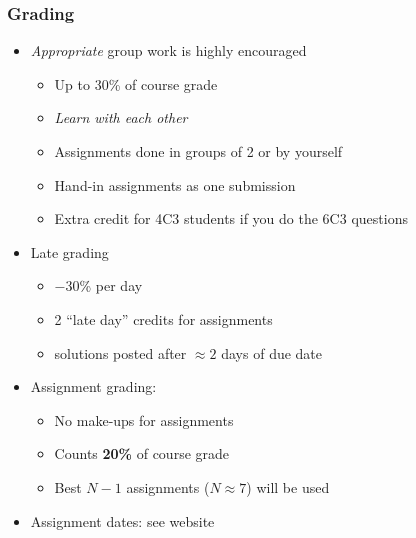 \begin{frame}\frametitle{Grading}
	\begin{itemize}
		\item	\emph{Appropriate} group work is highly encouraged 
		\begin{itemize}
			\item	Up to 30\% of course grade 
			\item	\emph{Learn with each other} 
			\item	Assignments done in groups of 2 or by yourself 
			\item	Hand-in assignments as one submission 
			\item	Extra credit for 4C3 students if you do the 6C3 questions
		\end{itemize}
		\item	Late grading 
		\begin{itemize}
			\item	\( -30 \)\% per day
			\item	2 ``late day'' credits for assignments 
			\item	solutions posted after $\approx 2$ days of due date 
		\end{itemize}
		\item	Assignment grading: 
		\begin{itemize}
			\item	No make-ups for assignments 
			\item	Counts \textbf{20\%} of course grade 
			\item	Best $N-1$ assignments ($N \approx 7$) will be used 
		\end{itemize}
		\item	Assignment dates: see website 
	\end{itemize}
\end{frame}

